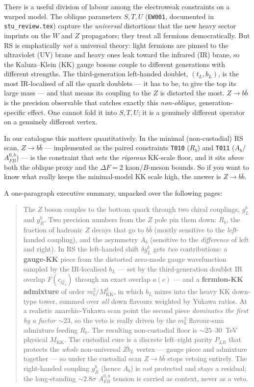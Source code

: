 \documentclass[11pt]{article}
\newcommand{\MKK}{M_{\mathrm{KK}}}
\newcommand{\PLR}{P_{LR}}
\newcommand{\code}[1]{\texttt{#1}}
\newcommand{\gL}{g_L^b}
\newcommand{\gR}{g_R^b}
\newcommand{\dgL}{\delta g_L^b}
\newcommand{\Afb}{A_{FB}^{0,b}}
\theoremstyle{definition}
\begin{document}
There is a useful division of labour among the electroweak constraints on a
warped model. The oblique parameters $S,T,U$ (\code{EW001}, documented in
\code{stu\_review.tex}) capture the \emph{universal} distortions that the new
heavy sector imprints on the $W$ and $Z$ propagators; they treat all fermions
democratically. But RS is emphatically \emph{not} a universal theory: light
fermions are pinned to the ultraviolet (UV) brane and heavy ones leak toward the
infrared (IR) brane, so the Kaluza--Klein (KK) gauge bosons couple to different
generations with different strengths. The third-generation left-handed doublet,
$(t_L, b_L)$, is the most IR-localised of all the quark doublets --- it has to
be, to give the top its large mass --- and that means its coupling to the
$Z$ is distorted the most. $Z\to b\bar b$ is the precision observable that
catches exactly this \emph{non-oblique}, generation-specific effect. One cannot
fold it into $S,T,U$; it is a genuinely different operator on a genuinely
different vertex.

In our catalogue this matters quantitatively. In the minimal (non-custodial) RS
scan, $Z\to b\bar b$ --- implemented as the paired constraints \code{T010}
($R_b$) and \code{T011} ($A_b$/$\Afb$) --- is the constraint that sets the
\emph{rigorous} KK-scale floor, and it sits \emph{above} both the oblique
proxy and the $\Delta F=2$ kaon/$B$-meson bounds. So if you want to know what
really keeps the minimal-model KK scale high, the answer is $Z\to b\bar b$.

A one-paragraph executive summary, unpacked over the following pages:

\begin{quote}
\small
The $Z$ boson couples to the bottom quark through two chiral couplings, $\gL$
and $\gR$. Two precision numbers from the $Z$ pole pin them down: $R_b$, the
fraction of hadronic $Z$ decays that go to $b\bar b$ (mostly sensitive to the
\emph{left}-handed coupling), and the asymmetry $A_b$ (sensitive to the
\emph{difference} of left and right). In RS the left-handed shift $\dgL$ gets
\emph{two} contributions: a \textbf{gauge-KK} piece from the distorted
zero-mode gauge wavefunction sampled by the IR-localised $b_L$ --- set by the
third-generation doublet IR overlap $F(c_{Q_3})$ through an exact overlap
$a(c)$ --- and a \textbf{fermion-KK admixture} of order $m_b^2/\MKK^2$, in which
$b_L$ mixes into the heavy KK down-type tower, summed over \emph{all} down
flavours weighted by Yukawa ratios. At a realistic anarchic-Yukawa scan point
the second piece \emph{dominates the first by a factor $\sim 23$}, so the veto is
really driven by the $m_b^2$ flavour-sum admixture feeding $R_b$. The resulting
non-custodial floor is $\sim 25$--$30$~TeV physical $\MKK$. The custodial cure is a discrete
left--right parity $\PLR$ that protects the \emph{whole} non-universal $Zb_L$
vertex --- gauge piece and admixture together --- so under the custodial
scan $Z\to b\bar b$ stops vetoing entirely. The right-handed coupling $\gR$
(hence $A_b$) is \emph{not} protected and stays a residual; the long-standing
$\sim 2.8\sigma$ $\Afb$ tension is carried as context, never as a veto.
\end{quote}
\end{document}
